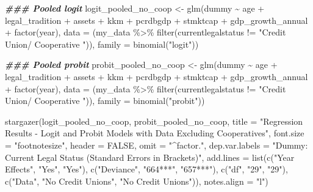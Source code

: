 \documentclass[a4paper,nobind]{templates/ociamthesis}
\newenvironment{Shaded}{\begin{snugshade}}{\end{snugshade}}
\newcommand{\AttributeTok}[1]{\textcolor[rgb]{0.77,0.63,0.00}{#1}}
\newcommand{\ConstantTok}[1]{\textcolor[rgb]{0.00,0.00,0.00}{#1}}
\newcommand{\DocumentationTok}[1]{\textcolor[rgb]{0.56,0.35,0.01}{\textbf{\textit{#1}}}}
\newcommand{\FunctionTok}[1]{\textcolor[rgb]{0.00,0.00,0.00}{#1}}
\newcommand{\NormalTok}[1]{#1}
\newcommand{\OtherTok}[1]{\textcolor[rgb]{0.56,0.35,0.01}{#1}}
\newcommand{\SpecialCharTok}[1]{\textcolor[rgb]{0.00,0.00,0.00}{#1}}
\newcommand{\StringTok}[1]{\textcolor[rgb]{0.31,0.60,0.02}{#1}}
\renewenvironment{Shaded}
{
  \vspace{10pt}%
  \begin{snugshade}%
}{%
  \end{snugshade}%
  \vspace{8pt}%
}
\begin{document}
\begin{Shaded}
\begin{Highlighting}[]
\DocumentationTok{\#\#\# Pooled logit}
\NormalTok{logit\_pooled\_no\_coop }\OtherTok{\textless{}{-}} \FunctionTok{glm}\NormalTok{(dummy }\SpecialCharTok{\textasciitilde{}}\NormalTok{ age }\SpecialCharTok{+}\NormalTok{ legal\_tradition }\SpecialCharTok{+} 
\NormalTok{       assets }\SpecialCharTok{+}\NormalTok{ kkm }\SpecialCharTok{+} 
\NormalTok{       pcrdbgdp }\SpecialCharTok{+}\NormalTok{ stmktcap }\SpecialCharTok{+}\NormalTok{ gdp\_growth\_annual }\SpecialCharTok{+} \FunctionTok{factor}\NormalTok{(year), }
       \AttributeTok{data =}\NormalTok{ (my\_data }\SpecialCharTok{\%\textgreater{}\%} \FunctionTok{filter}\NormalTok{(currentlegalstatus }\SpecialCharTok{!=} \StringTok{"Credit Union/ Cooperative "}\NormalTok{)), }\AttributeTok{family =} \FunctionTok{binomial}\NormalTok{(}\StringTok{"logit"}\NormalTok{))}

\DocumentationTok{\#\#\# Pooled probit}
\NormalTok{probit\_pooled\_no\_coop }\OtherTok{\textless{}{-}} \FunctionTok{glm}\NormalTok{(dummy }\SpecialCharTok{\textasciitilde{}}\NormalTok{ age }\SpecialCharTok{+}\NormalTok{ legal\_tradition }\SpecialCharTok{+} 
\NormalTok{       assets }\SpecialCharTok{+}\NormalTok{ kkm }\SpecialCharTok{+} 
\NormalTok{       pcrdbgdp }\SpecialCharTok{+}\NormalTok{ stmktcap }\SpecialCharTok{+}\NormalTok{ gdp\_growth\_annual }\SpecialCharTok{+} \FunctionTok{factor}\NormalTok{(year), }
       \AttributeTok{data =}\NormalTok{ (my\_data }\SpecialCharTok{\%\textgreater{}\%} \FunctionTok{filter}\NormalTok{(currentlegalstatus }\SpecialCharTok{!=} \StringTok{"Credit Union/ Cooperative "}\NormalTok{)), }\AttributeTok{family =} \FunctionTok{binomial}\NormalTok{(}\StringTok{"probit"}\NormalTok{))}

\FunctionTok{stargazer}\NormalTok{(logit\_pooled\_no\_coop, probit\_pooled\_no\_coop, }\AttributeTok{title =} \StringTok{"Regression Results {-} Logit and Probit Models with Data Excluding Cooperatives"}\NormalTok{, }\AttributeTok{font.size =} \StringTok{"footnotesize"}\NormalTok{, }\AttributeTok{header =} \ConstantTok{FALSE}\NormalTok{, }\AttributeTok{omit =} \StringTok{"\^{}factor."}\NormalTok{, }\AttributeTok{dep.var.labels =} \StringTok{"Dummy: Current Legal Status (Standard Errors in Brackets)"}\NormalTok{, }\AttributeTok{add.lines =} \FunctionTok{list}\NormalTok{(}\FunctionTok{c}\NormalTok{(}\StringTok{"Year Effects"}\NormalTok{, }\StringTok{"Yes"}\NormalTok{, }\StringTok{"Yes"}\NormalTok{),                      }
\FunctionTok{c}\NormalTok{(}\StringTok{"Deviance"}\NormalTok{, }\StringTok{"664***"}\NormalTok{, }\StringTok{"657***"}\NormalTok{), }\FunctionTok{c}\NormalTok{(}\StringTok{"df"}\NormalTok{, }\StringTok{"29"}\NormalTok{, }\StringTok{"29"}\NormalTok{), }\FunctionTok{c}\NormalTok{(}\StringTok{"Data"}\NormalTok{, }\StringTok{"No Credit Unions"}\NormalTok{, }\StringTok{"No Credit Unions"}\NormalTok{)), }\AttributeTok{notes.align =} \StringTok{"l"}\NormalTok{)}
\end{Highlighting}
\end{Shaded}
\end{document}
